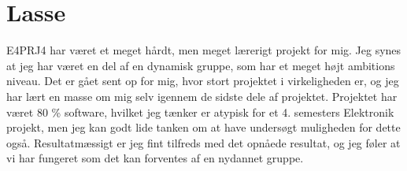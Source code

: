 \section{Lasse} 

E4PRJ4 har været et meget hårdt, men meget lærerigt projekt for mig. Jeg synes at jeg har været en del af en dynamisk gruppe, som har et meget højt ambitions niveau. Det er gået sent op for mig, hvor stort projektet i virkeligheden er, og jeg har lært en masse om mig selv igennem de sidste dele af projektet. Projektet har været 80 \% software, hvilket jeg tænker er atypisk for et 4. semesters Elektronik projekt, men jeg kan godt lide tanken om at have undersøgt muligheden for dette også. Resultatmæssigt er jeg fint tilfreds med det opnåede resultat, og jeg føler at vi har fungeret som det kan forventes af en nydannet gruppe. 